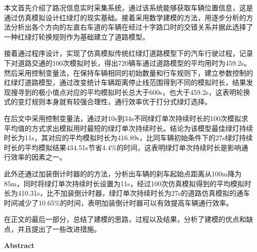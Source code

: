 \documentclass[a4paper,12pt]{article}
\numberwithin{equation}{section}
\providecommand{\keywords}[1]{\fontsize{14pt}{16.8pt}\selectfont\textbf{{KEY\ WORDS:}} #1}
\begin{document}
	\begin{spacing}{1.19}
		\fontsize{14pt}{16.8pt}\selectfont
	本文首先介绍了路况信息实时采集系统，通过该系统能够获取车辆位置信息，这是通过仿真模拟设计红绿灯的现实基础。接着采用数学建模的方法，用逐步分析的方法分析出各个方向的左直右车道的车辆在经过十字路口时的交错关系并据此选择了一种红绿灯轮换规则作为基础建立了道路模型。\par 
	接着通过程序设计，实现了仿真模拟传统红绿灯道路模型下的汽车行驶过程，记录下对道路交通的100次模拟时长，得出720辆车通过道路模型的平均用时为459.2s。然后采用控制变量法，在保持车辆相同的初始数量和行车规则下，建立参数控制的红绿灯道路模型，通过改变统计车辆距离停止线范围得到不同的模拟时长，结果发现搜寻到的极小值点对应的平均模拟时长总大于600s，也大于459.2s，这表明轮换式的变灯规则本身就有较强合理性，通行效率优于打分式绿灯选择。\par 
	在后文中采用控制变量法，通过对10s到34s不同绿灯单次持续时长的100次模拟求平均值的方式求出模拟用时最短的绿灯单次持续时长。结论为该模型最佳绿灯持续时长为11s，其对应的平均模拟时长为416.89s，比同车辆初始条件下的27s绿灯持续时长的平均模拟结果434.51s节省4.4\%的时间，这表明绿灯单次持续时长是影响通行效率的因素之一。\par
	此外还通过加装倒计时器的的方法，分析出车辆的刹车起始点距离从100m降为85m，同时将绿灯单次持续时长设置为11s，经过100次仿真模拟得到的平均模拟时长为410.31s，比不加装倒计时器，绿灯单次持续时长为27s的道路仿真模拟的通车时间减少了10.65\%的时间，表明加装倒计时器可以有效提高车辆通行效率。\par
	在正文的最后一部分，总结了建模的思路，过程以及结果，分析了建模的优点和缺点，并且提出了一些改进措施。
	\end{spacing}
	
	\noindent \fontsize{14pt}{16.8pt}\selectfont {}\fontsize{14pt}{16.8pt}\selectfont {}
	\newpage
	\begin{center}
		\fontsize{15pt}{18pt}\selectfont \textbf{Abstract}
	\end{center}
	
\end{document}
